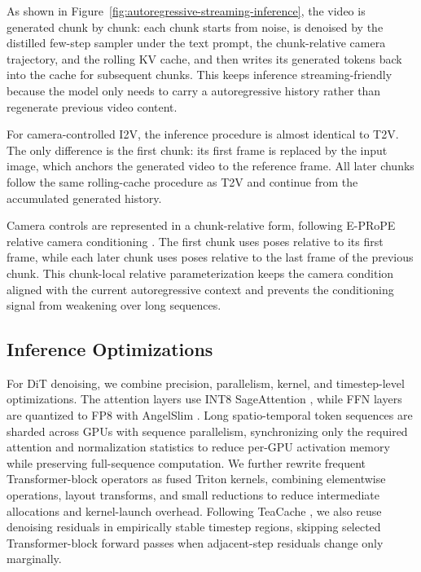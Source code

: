 \documentclass{llmxive}
\begin{document}
As shown in Figure~\ref{fig:autoregressive-streaming-inference}, the video is generated chunk by chunk: each chunk starts from noise, is denoised by the distilled few-step sampler under the text prompt, the chunk-relative camera trajectory, and the rolling KV cache, and then writes its generated tokens back into the cache for subsequent chunks. This keeps inference streaming-friendly because the model only needs to carry a autoregressive history rather than regenerate previous video content.

For camera-controlled I2V, the inference procedure is almost identical to T2V. The only difference is the first chunk: its first frame is replaced by the input image, which anchors the generated video to the reference frame. All later chunks follow the same rolling-cache procedure as T2V and continue from the accumulated generated history.

Camera controls are represented in a chunk-relative form, following E-PRoPE relative camera conditioning \citep{li2025cameras}. The first chunk uses poses relative to its first frame, while each later chunk uses poses relative to the last frame of the previous chunk. This chunk-local relative parameterization keeps the camera condition aligned with the current autoregressive context and prevents the conditioning signal from weakening over long sequences.

\subsection{Inference Optimizations}

For DiT denoising, we combine precision, parallelism, kernel, and timestep-level optimizations. The attention layers use INT8 SageAttention \citep{zhang2025sageattention}, while FFN layers are quantized to FP8 with AngelSlim \citep{cen2026angelslim}. Long spatio-temporal token sequences are sharded across GPUs with sequence parallelism, synchronizing only the required attention and normalization statistics to reduce per-GPU activation memory while preserving full-sequence computation. We further rewrite frequent Transformer-block operators as fused Triton kernels, combining elementwise operations, layout transforms, and small reductions to reduce intermediate allocations and kernel-launch overhead. Following TeaCache \citep{liu2025teacache}, we also reuse denoising residuals in empirically stable timestep regions, skipping selected Transformer-block forward passes when adjacent-step residuals change only marginally.
\end{document}
